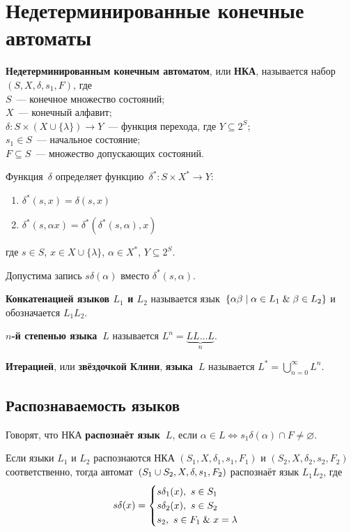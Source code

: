 \section{Недетерминированные конечные автоматы}
  \textbf{Недетерминированным конечным автоматом}, или \textbf{НКА}, называется набор~$(S, X, \delta, s_1, F)$, где\\
$S$~--- конечное множество состояний;\\
$X$~--- конечный алфавит;\\
$\delta \colon S \times (X \cup \{ \lambda \}) \to Y$~--- функция перехода, где $Y \subseteq 2^S$;\\
$s_1 \in S$~--- начальное состояние;\\
$F \subseteq S$~--- множество допускающих состояний.

Функция~$\delta$ определяет функцию~$\delta^* \colon S \times X^* \to Y$:
\begin{enumerate}
	\item $\delta^*(s, x) = \delta(s, x)$
	\item $\delta^*(s, \alpha x) = \delta^*(\delta^*(s, \alpha), x)$
\end{enumerate}
где $s \in S$, $x \in X \cup \{ \lambda \}$, $\alpha \in X^*$, $Y \subseteq 2^S$.

Допустима запись $s \delta(\alpha)$ вместо $\delta^*(s, \alpha)$.

 \textbf{Конкатенацией языков $L_1$ и $L_2$} называется язык~$\{ \alpha \beta \mid \alpha \in L_1 \mathrel{\&} \beta \in L_2 \}$ и обозначается $L_1 L_2$.

 \textbf{$n$-й степенью языка~$L$} называется $L^n = \underbrace{L L \ldots L}_n$.

  \textbf{Итерацией}, или \textbf{звёздочкой Клини}, \textbf{языка~$L$} называется $L^* = \bigcup\limits_{n=0}^\infty L^n$.

\subsection{Распознаваемость языков}
Говорят, что НКА \textbf{распознаёт язык~$L$}, если $\alpha \in L \Leftrightarrow s_1 \delta(\alpha) \cap F \neq \varnothing$.

Если языки $L_1$ и $L_2$ распознаются НКА $(S_1, X, \delta_1, s_1, F_1)$ и $(S_2, X, \delta_2, s_2, F_2)$ соответственно, тогда автомат~$(S_1 \opbr\cup S_2, \allowbreak X, \allowbreak \delta, \allowbreak s_1, \allowbreak F_2)$ распознаёт язык $L_1 L_2$, где
\begin{equation*}
s \delta(x) =
\begin{cases}
s \delta_1(x), \ s \in S_1 \\
s \delta_2(x), \ s \in S_2 \\
s_2, \ s \in F_1 \mathrel{\&} x = \lambda
\end{cases}
\end{equation*}

